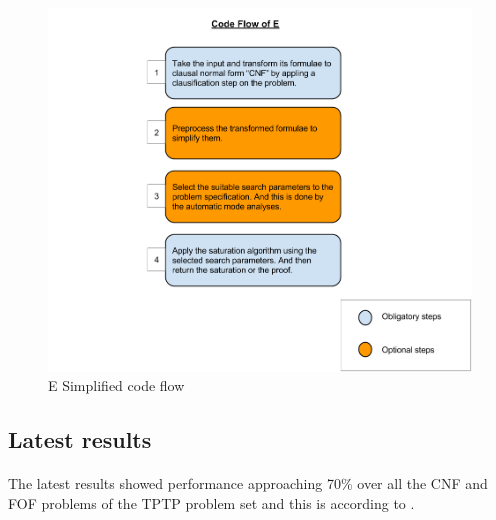 	\begin{figure}[H]
		\centering
		\includegraphics[scale=0.45]{pictures/e_code_flow.png}
		\caption{E Simplified code flow}\label{fig:e_code_flow}
	\end{figure}



\subsection{Latest results}
\paragraph{}
The latest results showed performance approaching 70\% over all the CNF and FOF problems of the TPTP problem set and this is according to \cite{E13}.